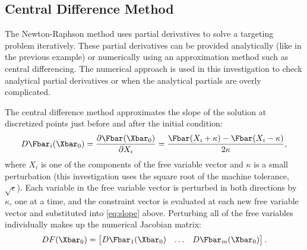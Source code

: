 \subsection{Central Difference Method}
The Newton-Raphson method uses partial derivatives to solve a targeting problem iteratively. These
partial derivatives can be provided analytically (like in the previous example) or numerically
using an approximation method such as central differencing. The numerical approach is used in this
investigation to check analytical partial derivatives or when the analytical partials are overly
complicated.

The central difference method approximates the slope of the solution at discretized points just
before and after the initial condition:
\begin{equation}
    D\Fbar_{i}(\Xbar_{0})=\frac{\partial\Fbar(\Xbar_{0})}{\partial X_{i}}=\frac{\Fbar(X_{i}+\kappa)-\Fbar(X_{i}-\kappa)}{2\kappa},
    \label{eq:slope}
\end{equation}
where $X_{i}$ is one of the components of the free variable vector and $\kappa$ is a small
perturbation (this investigation uses the square root of the machine tolerance, $\sqrt{\epsilon}$).
Each variable in the free variable vector is perturbed in both directions by $\kappa$, one at a
time, and the constraint vector is evaluated at each new free variable vector and substituted into
\cref{eq:slope} above. Perturbing all of the free variables individually makes up the numerical
Jacobian matrix:
\begin{equation}
    DF(\Xbar_{0})=\begin{bmatrix}   D\Fbar_{1}(\Xbar_{0})   &   \dots   &   D\Fbar_{m}(\Xbar_{0})\end{bmatrix}.
    \label{eq:centraldifference}
\end{equation}
